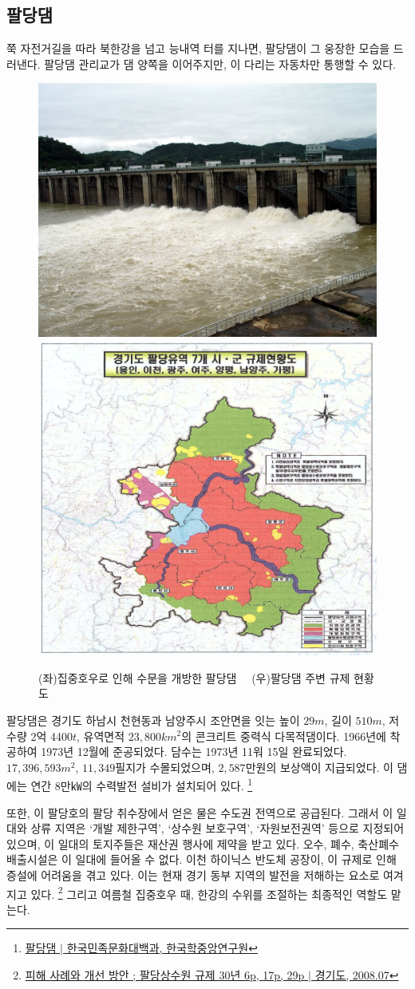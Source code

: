 \subsection{팔당댐}
쭉 자전거길을 따라 북한강을 넘고 능내역 터를 지나면, 팔당댐이 그 웅장한 모습을 드러낸다. 
팔당댐 관리교가 댐 양쪽을 이어주지만, 이 다리는 자동차만 통행할 수 있다.


 
\begin{figure}[ht]
   \centering
   \includegraphics[width=.4\textwidth]{img/팔당댐.jpg}
   \includegraphics[width=.4\textwidth]{img/규제현황도.PNG}
    
   \caption{(좌)집중호우로 인해 수문을 개방한 팔당댐\protect\footnotemark $\quad$ (우)팔당댐 주변 규제 현황도\protect\footnotemark}
   \label{fig:my_labe9}
\end{figure}
\footnotetext{\ref{paldang}}


팔당댐은 경기도 하남시 천현동과 남양주시 조안면을 잇는
높이 $29m$, 길이 $510m$, 저수량 2억 4400$t$, 유역면적 $23,800km^2$의 콘크리트 중력식 다목적댐이다.
1966년에 착공하여 1973년 12월에 준공되었다.
담수는 1973년 11워 15일 완료되었다.
$17,396,593 m^2$, $11,349$필지가 수몰되었으며, $2,587$만원의 보상액이 지급되었다.
이 댐에는 연간 8만㎾의 수력발전 설비가 설치되어 있다.
\footnote{\href{https://terms.naver.com/entry.naver?docId=531161&cid=46631&categoryId=46631}{팔당댐 $|$ 한국민족문화대백과, 한국학중앙연구원}}


또한, 이 팔당호의 팔당 취수장에서 얻은 물은 수도권 전역으로 공급된다.
그래서 이 일대와 상류 지역은 `개발 제한구역', `상수원 보호구역', `자원보전권역'
등으로 지정되어 있으며,
이 일대의 토지주들은 재산권 행사에 제약을 받고 있다.
오수, 폐수, 축산폐수 배출시설은 이 일대에 들어올 수 없다.
이천 하이닉스 반도체 공장이, 이 규제로 인해 증설에 어려움을 겪고 있다.
이는 현재 경기 동부 지역의 발전을 저해하는 요소로 여겨지고 있다.
\footnote{\label{paldang}\href{https://memory.library.kr/items/show/37492}{피해 사례와 개선 방안 ; 팔당상수원 규제 30년 6p, 17p, 29p $|$ 경기도, 2008.07}}
그리고 여름철 집중호우 때, 한강의 수위를 조절하는 최종적인 역할도 맡는다.

